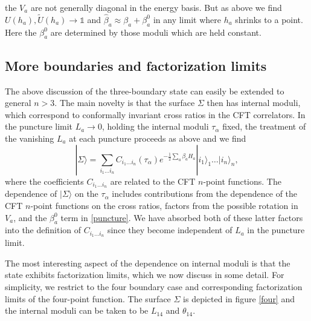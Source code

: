 \documentclass[12pt]{article}
\newcommand{\be}{\begin{equation}}
\newcommand{\ee}{\end{equation}}
\numberwithin{equation}{section}
\begin{document}
the $V_a$ are not generally diagonal in the energy basis.  But as above we find $U(h_a), \tilde U(h_a) \rightarrow \mathds{1}$ and $\hat \beta_a \approx \beta _a + \beta^0_a$ in any limit where $h_a$ shrinks to a point.  Here the $\beta^0_a$ are determined by those moduli which are held constant.




%
\subsection{More boundaries and factorization limits}
\label{factorization}
%


The above discussion of the three-boundary state can easily be extended to general $n > 3$.  The main novelty is that the surface $\Sigma$ then has internal moduli, which correspond to conformally invariant cross ratios in the CFT correlators. In the puncture limit $L_a \rightarrow 0$, holding the internal moduli $\tau_\alpha$ fixed, the treatment of the vanishing $L_a$ at each puncture proceeds as above and we find
%
\be
\label{4state}
|\Sigma \rangle = \sum_{i_1 \ldots i_n} C_{i_1 \ldots i_n}(\tau_\alpha) e^{-\frac{1}{2}\sum_a \beta_a H_{a}} |i_1 \rangle_1 \ldots  |i_n \rangle_n,
\ee
%
where the coefficients $C_{i_1 \ldots i_n}$ are related to the CFT $n$-point functions. The dependence of $|\Sigma \rangle$ on the %
$\tau_\alpha$
includes contributions from the dependence of the CFT $n$-point functions on the cross ratios, factors from the possible rotation in $V_a$, and the $\beta_a^0$ term in \eqref{puncture}.  We have absorbed both of these latter factors into the definition of $C_{i_1 \ldots i_n}$ since they become independent of $L_a$ in the puncture limit.

The most interesting aspect of the dependence on internal moduli is that the state exhibits factorization limits, which we now discuss in some detail. For simplicity, we restrict to the four boundary case and corresponding factorization limits of the four-point function. The surface $\Sigma$ is depicted in figure \ref{four} and the internal moduli can be taken to be $L_{14}$ and $\theta_{14}$.
\end{document}

